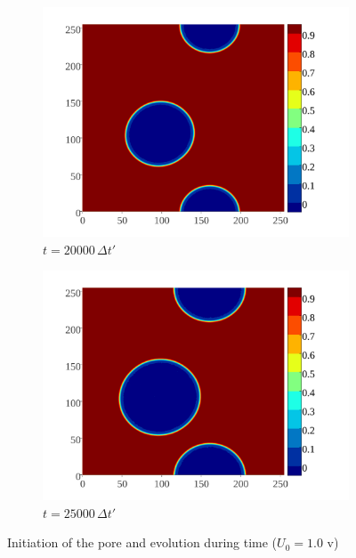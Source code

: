 \documentclass[english,12pt]{article}
\begin{document}
\begin{figure}[H]
    \begin{subfigure}[b]{0.45\textwidth}
        \includegraphics[width=\textwidth]{pics/20000.pdf}
        \caption{$t=20000\,\Delta t'$}
        \label{fig:third}
    \end{subfigure}
    \begin{subfigure}[b]{0.45\textwidth}
        \includegraphics[width=\textwidth]{pics/24000.pdf}
        \caption{$t=25000\,\Delta t'$}
        \label{fig:finish}
    \end{subfigure}
    \caption{Initiation of the pore and evolution during time ($U_0=1.0$ v)}\label{fig:orderparameters}
\end{figure}

\newpage


\end{document}
